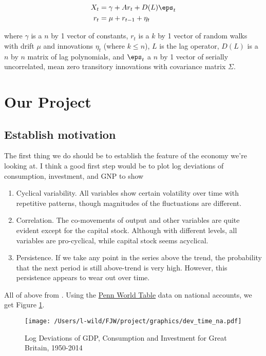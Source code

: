 \begin{align}
  X_t & = \gamma + Ar_t + D(L)\eps_t \\
  r_t & =  \mu + r_{t-1} +\eta_t
\end{align}

where $\gamma$ is a $n$ by 1 vector of constants, $r_t$ is a $k$ by 1 vector of random walks with drift $\mu$ and innovations $\eta_t$ (where $k\leq n$), $L$ is the
lag operator, $D(L)$ is a $n$ by $n$ matrix of lag polynomials, and $\eps_t$ a $n$ by 1 vector of serially uncorrelated, mean zero transitory innovations with
covariance matrix $\Sigma$.



\section{Our Project}

\subsection{Establish motivation}

The first thing we do should be to establish the feature of the economy we're looking at. I think a good first step would be to
plot log deviations of consumption, investment, and GNP to show

\begin{enumerate}
  \item Cyclical variability. All variables show certain volatility over time with
  repetitive patterns, though magnitudes of the fluctuations are different.
  \item Correlation. The co-movements of output and other variables are quite
  evident except for the capital stock. Although with different levels, all
  variables are pro-cyclical, while capital stock seems acyclical.
  \item Persistence. If we take any point in the series above the trend, the
  probability that the next period is still above-trend is very high. However,
  this persistence appears to wear out over time.
\end{enumerate}

All of above from \cite[p.9]{deng_real_2009}. Using the \href{http://www.rug.nl/ggdc/productivity/pwt/}{Penn World Table} data on national accounts, we get Figure
\ref{fig:deviations}.

\begin{figure}[!htpb]
  \centering
  \caption{Log Deviations of GDP, Consumption and Investment for Great Britain, 1950-2014}
  \label{fig:deviations}
  \texttt{[image: /Users/l-wild/FJW/project/graphics/dev\_time\_na.pdf]}
\end{figure}


